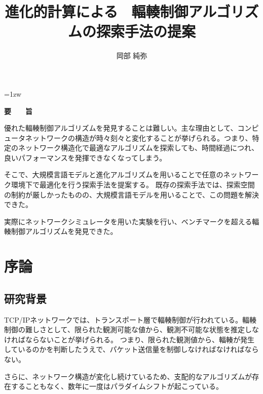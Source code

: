 \documentclass[a4paper,11pt]{jreport}
\title{進化的計算による \ 輻輳制御アルゴリズムの探索手法の提案}
\author{岡部 純弥}
\begin{document}
\maketitle
\thispagestyle{empty}
\newpage

\thispagestyle{empty}
\vspace*{20pt plus 1fil}
\parindent=1zw
\noindent
\begin{center}
{\Large \bf 要　　旨}
\vspace{2cm}
\end{center}

優れた輻輳制御アルゴリズムを発見することは難しい。主な理由として、コンピュータネットワークの構造が時々刻々と変化することが挙げられる。つまり、特定のネットワーク構造化で最適なアルゴリズムを探索しても、時間経過につれ、良いパフォーマンスを発揮できなくなってしまう。

そこで、大規模言語モデルと進化アルゴリズムを用いることで任意のネットワーク環境下で最適化を行う探索手法を提案する。
既存の探索手法では、探索空間の制約が厳しかったものの、大規模言語モデルを用いることで、この問題を解決できた。

実際にネットワークシミュレータを用いた実験を行い、ベンチマークを超える輻輳制御アルゴリズムを発見できた。

\par
\vspace{0pt plus 1fil}
\newpage

\tableofcontents
\listoffigures

\pagebreak \setcounter{page}{1}

\chapter{序論}

\section{研究背景}

TCP/IPネットワークでは、トランスポート層で輻輳制御が行われている。輻輳制御の難しさとして、限られた観測可能な値から、観測不可能な状態を推定しなければならないことが挙げられる。
つまり、限られた観測値から、輻輳が発生しているのかを判断したうえで、パケット送信量を制御しなければなければならない。

さらに、ネットワーク構造が変化し続けているため、支配的なアルゴリズムが存在することもなく、数年に一度はパラダイムシフトが起こっている。
\end{document}
